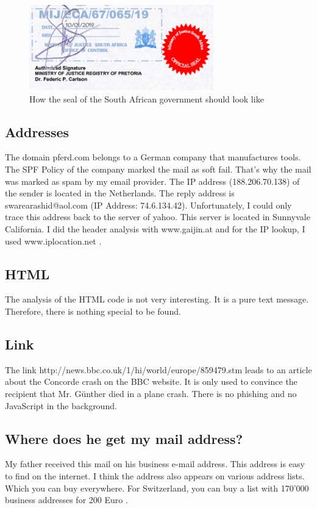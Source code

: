 \documentclass[12pt]{article}
\begin{document}
\begin{figure}[h]
 \includegraphics[width=8cm]{seal.png}
  \centering
  \caption{How the seal of the South African government should look like}
  \label{fig:seal}
\end{figure}

\subsection{Addresses}
The domain pferd.com belongs to a German company that manufactures tools. The SPF Policy of the company marked the mail as soft fail. That's why the mail was marked as spam by my email provider.  The IP address (188.206.70.138) of the sender is located in the Netherlands. The reply address is swarearashid@aol.com (IP Address: 74.6.134.42). Unfortunately, I could only trace this address back to the server of yahoo. This server is located in Sunnyvale California.
I did the header analysis with www.gaijin.at \cite{mailHeader} and for the IP lookup, I used www.iplocation.net \cite{iploc}.

\subsection{HTML}
The analysis of the HTML code is not very interesting. It is a pure text message. Therefore, there is nothing special to be found. 

\subsection{Link}
The link http://news.bbc.co.uk/1/hi/world/europe/859479.stm  leads to an article about the Concorde crash on the BBC website. It is only used to convince the recipient that Mr. Günther died in a plane crash. There is no phishing and no JavaScript in the background. 

\subsection{Where does he get my mail address?}
My father received this mail on his business e-mail address. This address is easy to find on the internet. I think the address also appears on various address lists. Which you can buy everywhere. For Switzerland, you can buy a list with 170’000 business addresses for 200 Euro \cite{adresspool}.
\end{document}
